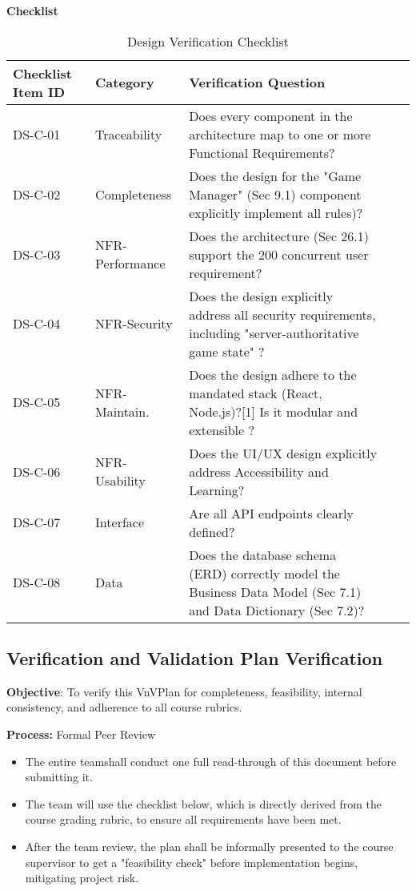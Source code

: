 \documentclass[12pt, titlepage]{article}
\begin{document}
\noindent \textbf{Checklist}
\begin{table}[H]
\centering
\caption{Design Verification Checklist}
\label{tab:design-checklist}
\begin{tabular}{|l|l|p{}|l|l|}
\hline
\textbf{Checklist Item ID} & \textbf{Category} & \textbf{Verification Question}  \\ \hline
DS-C-01 & Traceability & Does every component in the architecture map to one or more Functional Requirements? \\ \hline
DS-C-02 & Completeness & Does the design for the "Game Manager" (Sec 9.1) component explicitly implement all rules)? \\ \hline
DS-C-03 & NFR-Performance & Does the architecture (Sec 26.1) support the 200 concurrent user requirement? \\ \hline
DS-C-04 & NFR-Security & Does the design explicitly address all security requirements, including "server-authoritative game state" ?  \\ \hline
DS-C-05 & NFR-Maintain. & Does the design adhere to the mandated stack (React, Node.js)?[1] Is it modular and extensible ?  \\ \hline
DS-C-06 & NFR-Usability & Does the UI/UX design explicitly address Accessibility and Learning?  \\ \hline
DS-C-07 & Interface & Are all API endpoints clearly defined?  \\ \hline
DS-C-08 & Data & Does the database schema (ERD) correctly model the Business Data Model (Sec 7.1) and Data Dictionary (Sec 7.2)? \\ \hline
\end{tabular}
\end{table}

\subsection{Verification and Validation Plan Verification}

\noindent \textbf{Objective}: To verify this VnVPlan for completeness, feasibility, internal consistency, and adherence to all course rubrics.

\noindent \textbf{Process:} Formal Peer Review
\begin{itemize}
	\item The entire teamshall conduct one full read-through of this document before submitting it.
	\item The team will use the checklist below, which is directly derived from the course grading rubric, to ensure all requirements have been met.
	\item After the team review, the plan shall be informally presented to the course supervisor to get a "feasibility check" before implementation begins, mitigating project risk.
\end{itemize}
\end{document}
